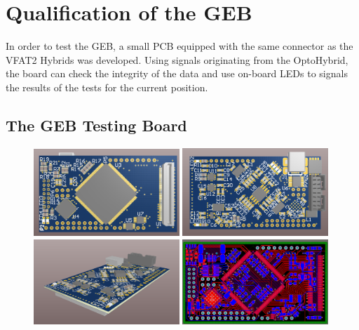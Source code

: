   \section{Qualification of the GEB}

    In order to test the GEB, a small PCB equipped with the same connector as the VFAT2 Hybrids was developed. Using signals originating from the OptoHybrid, the board can check the integrity of the data and use on-board LEDs to signals the results of the tests for the current position.

    \subsection{The GEB Testing Board}

      \begin{figure}[h!]
        \centering
        \includegraphics[width=0.49\textwidth]{img/II-5-qualification/geb-3d-0.png}
        \includegraphics[width=0.49\textwidth]{img/II-5-qualification/geb-3d-1.png}
        \vspace*{0.3cm}
        \includegraphics[width=0.49\textwidth]{img/II-5-qualification/geb-3d-2.png}
        \includegraphics[width=0.49\textwidth]{img/II-5-qualification/geb-pcb.png}
        \caption{}
        \label{fig:II-5-geb-pcb}
      \end{figure}

